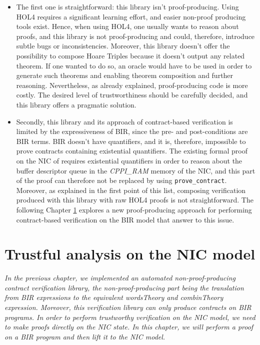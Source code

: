 \documentclass{kththesis}
\begin{document}
{\begin{itemize}
	\item The first one is straightforward: this library isn't proof-producing. Using HOL4 requires a significant learning effort, and easier non-proof producing tools exist. Hence, when using HOL4, one usually wants to reason about proofs, and this library is not proof-producing and could, therefore, introduce subtle bugs or inconsistencies. Moreover, this library doesn't offer the possibility to compose Hoare Triples because it doesn't output any related theorem. If one wanted to do so, an oracle would have to be used in order to generate such theorems and enabling theorem composition and further reasoning. Nevertheless, as already explained, proof-producing code is more costly. The desired level of trustworthiness should be carefully decided, and this library offers a pragmatic solution.
	\item Secondly, this library and its approach of contract-based verification is limited by the expressiveness of BIR, since the pre- and post-conditions are BIR terms. BIR doesn't have quantifiers, and it is, therefore, impossible to prove contracts containing existential quantifiers. The existing formal proof on the NIC of \cite{haglund_formal_2016} requires existential quantifiers in order to reason about the buffer descriptor queue in the \textit{CPPI\_RAM} memory of the NIC, and this part of the proof can therefore not be replaced by using \texttt{prove\_contract}. Moreover, as explained in the first point of this list, composing verification produced with this library with raw HOL4 proofs is not straightforward. The following Chapter \ref{trustful-nic-analysis} explores a new proof-producing approach for performing contract-based verification on the BIR model that answer to this issue.
\end{itemize}

\chapter{Trustful analysis on the NIC model} \label{trustful-nic-analysis}
\vspace{-1cm}
\textit{In the previous chapter, we implemented an automated non-\gls{proof-producing} contract verification library, the non-proof-producing part being the translation from BIR expressions to the equivalent \textit{wordsTheory} and \textit{combinTheory} expression. Moreover, this verification library can only produce contracts on BIR programs. In order to perform trustworthy verification on the \gls{NIC} model, we need to make proofs directly on the \gls{NIC} state. In this chapter, we will perform a proof on a BIR program and then lift it to the \gls{NIC} model.}

}
\end{document}

